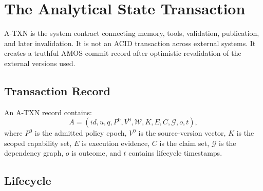 \documentclass[10pt]{article}
\newcommand{\amos}{\textsc{AMOS}\xspace}
\newcommand{\atxn}{\textsc{A-TXN}\xspace}
\newcommand{\work}{\mathcal{W}}
\newcommand{\prov}{\mathcal{G}}
\begin{document}
\section{The Analytical State Transaction}

\atxn is the system contract connecting memory, tools, validation, publication, and later invalidation. It is not an ACID transaction across external systems. It creates a truthful \amos commit record after optimistic revalidation of the external versions used.

\subsection{Transaction Record}

An \atxn record contains:
\begin{equation}
  A = (id, u, q, P^0, V^0, \work, K, E, C, \prov, o, t),
\end{equation}
where $P^0$ is the admitted policy epoch, $V^0$ is the source-version vector, $K$ is the scoped capability set, $E$ is execution evidence, $C$ is the claim set, $\prov$ is the dependency graph, $o$ is outcome, and $t$ contains lifecycle timestamps.

\subsection{Lifecycle}
\end{document}
